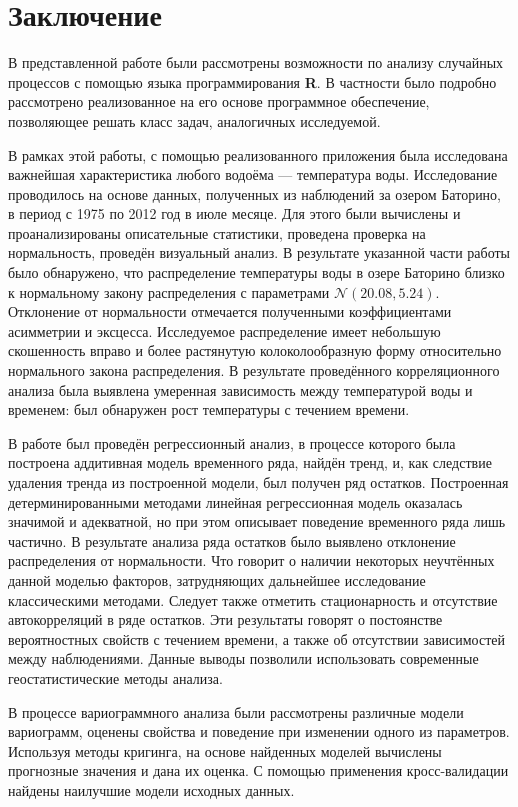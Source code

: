 
\chapter*{Заключение}

В представленной работе были рассмотрены возможности по анализу случайных процессов с помощью языка программирования \textbf{R}. В частности было подробно рассмотрено реализованное на его основе программное обеспечение, позволяющее решать класс задач, аналогичных исследуемой.

В рамках этой работы, с помощью реализованного приложения была исследована важнейшая характеристика любого водоёма --- температура воды. Исследование проводилось на основе данных, полученных из наблюдений за озером Баторино, в период с 1975 по 2012 год в июле месяце. Для этого были вычислены и проанализированы описательные статистики, проведена проверка на нормальность, проведён визуальный анализ. В результате указанной части работы было обнаружено, что распределение температуры воды в озере Баторино близко к нормальному закону распределения с параметрами $\mathcal{N}(20.08, 5.24)$. Отклонение от нормальности отмечается полученными коэффициентами асимметрии и эксцесса. Исследуемое распределение имеет небольшую скошенность вправо и более растянутую колоколообразную форму относительно нормального закона распределения. В результате проведённого корреляционного анализа была выявлена умеренная зависимость между температурой воды и временем: был обнаружен рост температуры с течением времени.

В работе был проведён регрессионный анализ, в процессе которого была построена аддитивная модель временного ряда, найдён тренд, и, как следствие удаления тренда из построенной модели, был получен ряд остатков. Построенная детерминированными методами линейная регрессионная модель оказалась значимой и адекватной, но при этом описывает поведение временного ряда лишь частично. В результате анализа ряда остатков было выявлено отклонение распределения от нормальности. Что говорит о наличии некоторых неучтённых данной моделью факторов, затрудняющих дальнейшее исследование классическими методами. Следует также отметить стационарность и отсутствие автокорреляций в ряде остатков. Эти результаты говорят о постоянстве вероятностных свойств с течением времени, а также об отсутствии зависимостей между наблюдениями. Данные выводы позволили использовать современные геостатистические методы анализа.

В процессе вариограммного анализа были рассмотрены различные модели вариограмм, оценены свойства и поведение при изменении одного из параметров. Используя методы кригинга, на основе найденных моделей вычислены прогнозные значения и дана их оценка. С помощью применения кросс-валидации найдены наилучшие модели исходных данных.